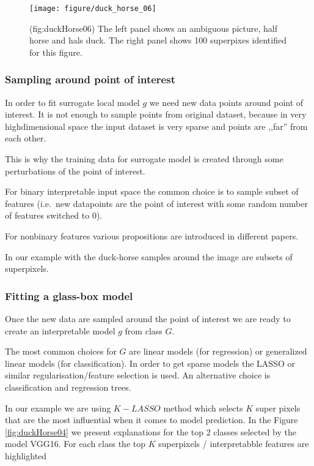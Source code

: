\documentclass[12pt,]{krantz}
\theoremstyle{definition}
\theoremstyle{definition}
\theoremstyle{definition}
\theoremstyle{remark}
\begin{document}
\begin{figure}

{\centering \texttt{[image: figure/duck\_horse\_06]} 

}

\caption{(fig:duckHorse06) The left panel shows an ambiguous picture, half horse and hals duck. The right panel shows 100 superpixes identified for this figure.}\label{fig:duckHorse06}
\end{figure}

\hypertarget{sampling-around-point-of-interest}{%
\subsubsection{Sampling around point of
interest}\label{sampling-around-point-of-interest}}

In order to fit surrogate local model \(g\) we need new data points
around point of interest. It is not enough to sample points from
original dataset, because in very highdimensional space the input
dataset is very sparse and points are ,,far'' from each other.

This is why the training data for surrogate model is created through
some perturbations of the point of interest.

For binary interpretable input space the common choice is to sample
subset of features (i.e.~new datapoints are the point of interest with
some random number of features switched to 0).

For nonbinary features various propositions are introduced in different
papers.

In our example with the duck-horse samples around the image are subsets
of superpixels.

\hypertarget{fitting-a-glass-box-model}{%
\subsubsection{Fitting a glass-box
model}\label{fitting-a-glass-box-model}}

Once the new data are sampled around the point of interest we are ready
to create an interpretable model \(g\) from class \(G\).

The most common choices for \(G\) are linear models (for regression) or
generalized linear models (for classification). In order to get sparse
models the LASSO or similar regularisation/feature selection is used. An
alternative choice is classification and regression trees.

In our example we are using \(K-LASSO\) method which selects \(K\) super
pixels that are the most influential when it comes to model prediction.
In the Figure \ref{fig:duckHorse04} we present explanations for the top
2 classes selected by the model VGG16. For each class the top \(K\)
superpixels / interpretabble features are highlighted
\end{document}
